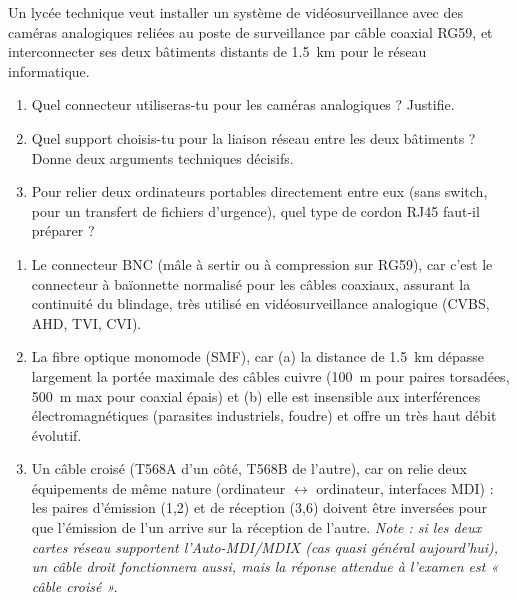 \documentclass[11pt]{article}
\newcommand{\cle}[1]{{\popxbold\color{popdark}#1}}
\begin{document}
\begin{exercice}
Un lycée technique veut installer un système de vidéosurveillance avec des caméras analogiques reliées au poste de surveillance par câble coaxial RG59, et interconnecter ses deux bâtiments distants de \SI{1.5}{km} pour le réseau informatique.
\begin{enumerate}
  \item Quel connecteur utiliseras-tu pour les caméras analogiques ? Justifie.
  \item Quel support choisis-tu pour la liaison réseau entre les deux bâtiments ? Donne deux arguments techniques décisifs.
  \item Pour relier deux ordinateurs portables directement entre eux (sans switch, pour un transfert de fichiers d'urgence), quel type de cordon RJ45 faut-il préparer ?
\end{enumerate}
\end{exercice}

\begin{corrige}
\begin{enumerate}
  \item Le connecteur \cle{BNC} (mâle à sertir ou à compression sur RG59), car c'est le connecteur à baïonnette normalisé pour les câbles coaxiaux, assurant la continuité du blindage, très utilisé en vidéosurveillance analogique (CVBS, AHD, TVI, CVI).
  \item La \cle{fibre optique monomode (SMF)}, car (a) la distance de \SI{1.5}{km} dépasse largement la portée maximale des câbles cuivre (\SI{100}{m} pour paires torsadées, \SI{500}{m} max pour coaxial épais) et (b) elle est insensible aux interférences électromagnétiques (parasites industriels, foudre) et offre un très haut débit évolutif.
  \item Un \cle{câble croisé} (T568A d'un côté, T568B de l'autre), car on relie deux équipements de même nature (ordinateur $\leftrightarrow$ ordinateur, interfaces MDI) : les paires d'émission (1,2) et de réception (3,6) doivent être inversées pour que l'émission de l'un arrive sur la réception de l'autre. \emph{Note : si les deux cartes réseau supportent l'Auto-MDI/MDIX (cas quasi général aujourd'hui), un câble droit fonctionnera aussi, mais la réponse attendue à l'examen est « câble croisé ».}
\end{enumerate}
\end{corrige}
\end{document}
